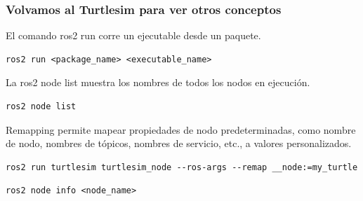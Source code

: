 \begin{frame}[fragile]
    \frametitle{Volvamos al Turtlesim para ver otros conceptos}
    
    El comando ros2 run corre un ejecutable desde un paquete.
\begin{lstlisting}[style=bash]    
ros2 run <package_name> <executable_name>
\end{lstlisting}

    La ros2 node list muestra los nombres de todos los nodos en ejecución.

\begin{lstlisting}[style=bash]    
ros2 node list
\end{lstlisting}

    Remapping permite mapear propiedades de nodo predeterminadas, como nombre de nodo, nombres de tópicos, nombres de servicio, etc., a valores personalizados.
    
\begin{lstlisting}[style=bash]    
ros2 run turtlesim turtlesim_node --ros-args --remap __node:=my_turtle
\end{lstlisting}

\begin{lstlisting}[style=bash]    
ros2 node info <node_name>
\end{lstlisting}
\end{frame}

